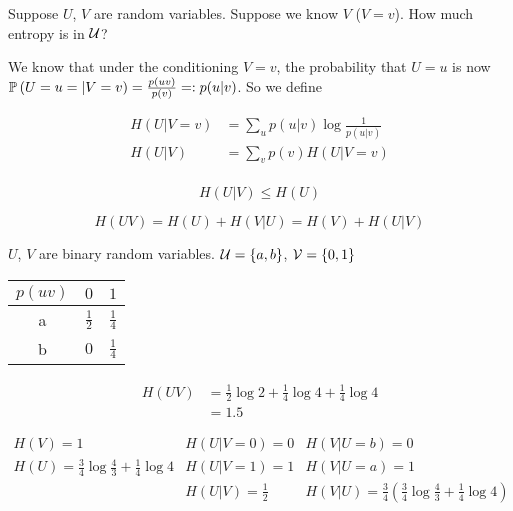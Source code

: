 Suppose $U$, $V$ are random variables. Suppose we know $V$ ($V = v$). How much entropy is in $\mathcal{U}$?

We know that under the conditioning $V=v$, the probability that $U=u$ is now $\mathbb{P}\left( U=u=\vert V=v \right) = \frac{p(uv)}{p(v)} =: p(u\vert v)$. So we define

\[
    \begin{aligned}
        H(U\vert V=v) &= \sum_u p(u\vert v) \log \frac{1}{p(u\vert v)}\\
        H(U\vert V) &= \sum_v p(v) H(U\vert V=v)\\
    \end{aligned}
\]

\begin{conjecture}
    \[
        H(U\vert V) \leqslant H(U)
    \]
\end{conjecture}

\begin{conjecture}
    \[
        H(UV) = H(U) + H(V \vert U) = H(V) + H(U \vert V)
    \]
\end{conjecture}

\begin{example}
    $U$, $V$ are binary random variables. $\mathcal{U} = \left\{ a,b \right\}$, $\mathcal{V} = \left\{ 0,1 \right\}$
    
    \begin{tabular}{c|cc}
        $p(uv)$ & $0$ & $1$\\
        \hline
        a & $\frac{1}{2}$ & $\frac{1}{4}$\\
        b & $0$ & $\frac{1}{4}$
    \end{tabular}
    
    \[
        \begin{aligned}
            H(UV) &= \frac{1}{2} \log 2 + \frac{1}{4} \log 4 + \frac{1}{4} \log 4\\
            &= 1.5
        \end{aligned}
    \]

    \[
        \begin{array}{lll}
            H(V) = 1 & H(U\vert V=0) = 0 & H(V\vert U=b) = 0 \\
            H(U) = \frac{3}{4} \log\frac{4}{3} + \frac{1}{4}\log 4 & H(U\vert V=1) = 1 & H(V\vert U=a) = 1 \\
            & H(U\vert V) = \frac{1}{2} & H(V\vert U) = \frac{3}{4}\left( \frac{3}{4} \log\frac{4}{3} + \frac{1}{4}\log 4 \right)
        \end{array}        
    \]
\end{example}

